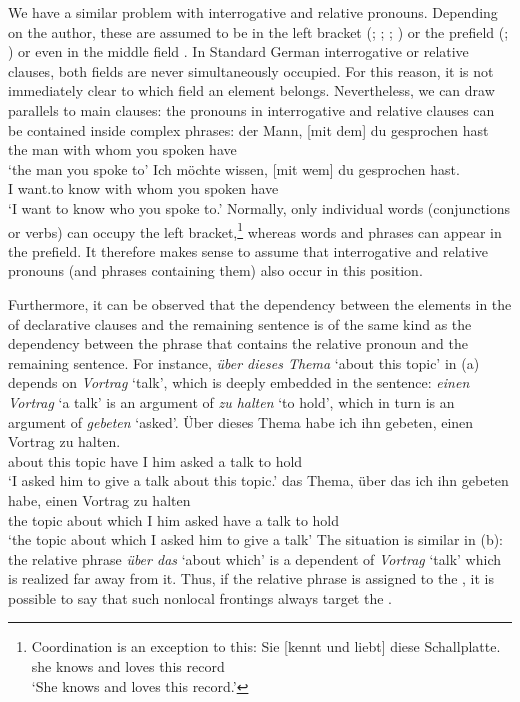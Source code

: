 We have a similar problem with interrogative and
relative pronouns. Depending on the author, these are assumed to be in the left bracket
(\citealp{Kathol2001a}; \citealp[--95]{Duerscheid2003a-u}; \citealp[]{Eisenberg2004a}; \citealp[, 57, 69--70]{Pafel2011a-u}) or the prefield
(\citealp[§1345]{Duden2005-Authors}; \citealp[--30, Section~3.1]{Woellstein2010a-u}) or even
in the middle field \citep[]{AH2004a-u}. In Standard German interrogative or relative
clauses, both fields are never simultaneously
occupied. For this reason, it is not immediately clear to which field an element
belongs. Nevertheless, we can draw parallels to main clauses: the pronouns in  interrogative and
relative clauses can be contained inside complex phrases: 
\eal
\ex 
\gll der Mann,         [mit dem] du gesprochen hast\\
     the man \spacebr{}with whom you spoken have\\
\glt `the man you spoke to'	 
\ex 
\gll Ich möchte wissen, [mit wem] du gesprochen hast.\\
     I want.to know \spacebr{}with whom you spoken have\\
\glt `I want to know who you spoke to.'
\zl
Normally, only individual words (conjunctions or verbs) can occupy the left bracket,\footnote{%
 Coordination is an exception to this:
\ea
\gll Sie [kennt und liebt] diese Schallplatte.\\
     she \spacebr{}knows and loves this record\\
\glt `She knows and loves this record.'
\z
} 
whereas words and phrases can appear in the prefield. It therefore makes sense to assume that interrogative and relative pronouns (and phrases containing them)
also occur in this position. 

Furthermore, it can be observed that the dependency between the elements in the \vf of declarative
clauses and the remaining sentence is of the same kind as the dependency between the phrase that
contains the relative pronoun and the remaining sentence. For instance, \emph{über dieses Thema}
`about this topic' in (a)
depends on \emph{Vortrag} `talk', which is deeply embedded in the sentence:
\emph{einen Vortrag} `a talk' is an argument of \emph{zu halten} `to hold', which in turn is an
argument of \emph{gebeten} `asked'.
\eal
\ex 
\gll Über dieses Thema habe ich ihn gebeten, einen Vortrag zu halten.\\
     about this topic  have I   him asked    a     talk    to hold\\
\glt `I asked him to give a talk about this topic.'
\ex 
\gll das Thema, über das ich ihn gebeten habe, einen Vortrag zu halten\\
     the topic  about which I him asked have a talk to hold\\
\glt `the topic about which I asked him to give a talk'
\zl
The situation is similar in (b): the relative phrase \emph{über das} `about which' is a dependent of
\emph{Vortrag} `talk' which is realized far away from it. Thus, if the relative phrase is assigned to the \vf, it is
possible to say that such nonlocal frontings always target the \vf.

